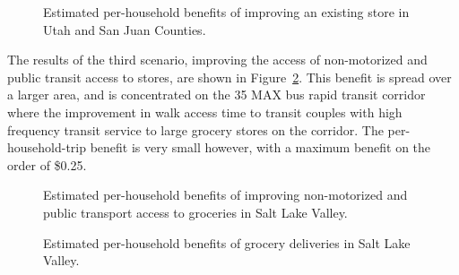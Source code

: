 \documentclass[
  letterpaper,
  number,
  review,
  doubleblind,
  3p]{elsarticle}
\begin{document}
\begin{figure}

\begin{minipage}{0.50\linewidth}



\end{minipage}%
%
\begin{minipage}{0.50\linewidth}



\end{minipage}%

\caption{\label{fig-s2sjut}Estimated per-household benefits of improving
an existing store in Utah and San Juan Counties.}

\end{figure}%

The results of the third scenario, improving the access of non-motorized
and public transit access to stores, are shown in
Figure~\ref{fig-s3results}. This benefit is spread over a larger area,
and is concentrated on the 35 MAX bus rapid transit corridor where the
improvement in walk access time to transit couples with high frequency
transit service to large grocery stores on the corridor. The
per-household-trip benefit is very small however, with a maximum benefit
on the order of \$0.25.

\begin{figure}


\caption{\label{fig-s3results}Estimated per-household benefits of
improving non-motorized and public transport access to groceries in Salt
Lake Valley.}

\end{figure}%

\begin{figure}


\caption{\label{fig-s4results}Estimated per-household benefits of
grocery deliveries in Salt Lake Valley.}

\end{figure}%
\end{document}
